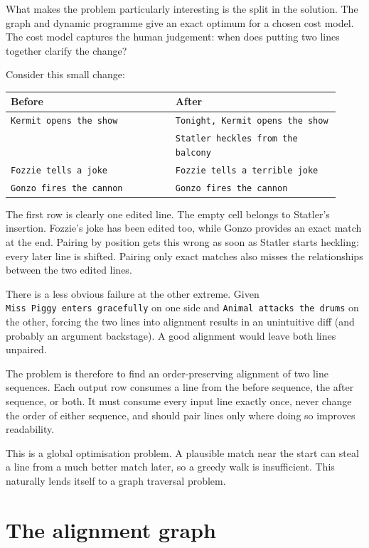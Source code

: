 \documentclass[
]{article}
\begin{document}
What makes the problem particularly interesting is the split in the
solution. The graph and dynamic programme give an exact optimum for a
chosen cost model. The cost model captures the human judgement: when
does putting two lines together clarify the change?

Consider this small change:

\begin{longtable}[]{@{}p{0.46\linewidth}p{0.46\linewidth}@{}}
\toprule
Before & After\tabularnewline
\midrule
\endhead
\texttt{Kermit opens the show} &
\texttt{Tonight, Kermit opens the show}\tabularnewline
& \texttt{Statler heckles from the balcony}\tabularnewline
\texttt{Fozzie tells a joke} &
\texttt{Fozzie tells a terrible joke}\tabularnewline
\texttt{Gonzo fires the cannon} &
\texttt{Gonzo fires the cannon}\tabularnewline
\bottomrule
\end{longtable}

The first row is clearly one edited line. The empty cell belongs to
Statler's insertion. Fozzie's joke has been edited too, while Gonzo
provides an exact match at the end. Pairing by position gets this wrong
as soon as Statler starts heckling: every later line is shifted. Pairing
only exact matches also misses the relationships between the two edited
lines.

There is a less obvious failure at the other extreme. Given
\texttt{Miss\ Piggy\ enters\ gracefully} on one side and
\texttt{Animal\ attacks\ the\ drums} on the other, forcing the two lines
into alignment results in an unintuitive diff (and probably an argument
backstage). A good alignment would leave both lines unpaired.

The problem is therefore to find an order-preserving alignment of two
line sequences. Each output row consumes a line from the before
sequence, the after sequence, or both. It must consume every input line
exactly once, never change the order of either sequence, and should pair
lines only where doing so improves readability.

This is a global optimisation problem. A plausible match near the start
can steal a line from a much better match later, so a greedy walk is
insufficient. This naturally lends itself to a graph traversal problem.

\hypertarget{the-alignment-graph}{%
\section{The alignment graph}\label{the-alignment-graph}}
\end{document}
